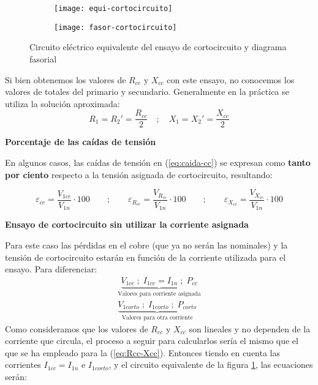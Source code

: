 \begin{figure}[H]
	\centering
	\begin{subfigure}[b]{.3\linewidth}
		\texttt{[image: equi-cortocircuito]}
		\caption{}
		\label{fig:ensayo-cc-equi}
	\end{subfigure}
	\begin{subfigure}[b]{.25\linewidth}
		\texttt{[image: fasor-cortocircuito]}
		\caption{}
		\label{fig:ensayo-cc-fasores}
	\end{subfigure}
	\caption{Circuito eléctrico equivalente del ensayo de cortocircuito y diagrama fasorial}
\end{figure}

Si bien obtenemos los valores de $R_{cc}$ y $X_{cc}$ con este ensayo, no conocemos los valores de totales del primario y secundario. Generalmente en la práctica se utiliza la solución aproximada:
\begin{equation*}
	R_{1}=R_{2}'=\dfrac{R_{cc}}{2}\quad;\quad X_{1}=X_{2}'=\dfrac{X_{cc}}{2}
\end{equation*}

\vspace{.5cm}

\textbf{Porcentaje de las caídas de tensión}

En algunos casos, las caídas de tensión en (\ref{eq:caida-cc}) se expresan como \textbf{tanto por ciento} respecto a la tensión asignada de cortocircuito, resultando:

\begin{equation}
	\varepsilon_{cc} = \dfrac{V_{1cc}}{V_{1n}} \cdot 100 \qquad;\qquad 
	\varepsilon_{R_{cc}} = \dfrac{V_{R_{cc}}}{V_{1n}} \cdot 100 \qquad;\qquad
	\varepsilon_{X_{cc}} = \dfrac{V_{X_{cc}}}{V_{1n}} \cdot 100
\end{equation}


\textbf{Ensayo de cortocircuito sin utilizar la corriente asignada}

Para este caso las pérdidas en el cobre (que ya no serán las nominales) y la tensión de cortocircuito estarán en función de la corriente utilizada para el ensayo. Para diferenciar:
\begin{gather*}
	\underbrace{V_{1cc}\; ; \; I_{1cc}=I_{1n} \; ; \; P_{cc}}_{\text{Valores para corriente asignada}}\\
	\underbrace{V_{1corto}\; ; \; I_{1corto} \; ; \; P_{corto}}_{\text{Valores para otra corriente}}
\end{gather*}
Como consideramos que los valores de $R_{cc}$ y $X_{cc}$ son lineales y no dependen de la corriente que circula, el proceso a seguir para calcularlos sería el mismo que el que se ha empleado para la (\ref{eq:Rcc-Xcc}). Entonces tiendo en cuenta las corrientes $I_{1cc}=I_{1n}$ e $I_{1corto}$, y el circuito equivalente de la figura \ref{fig:ensayo-cc-equi}, las ecuaciones serán:

